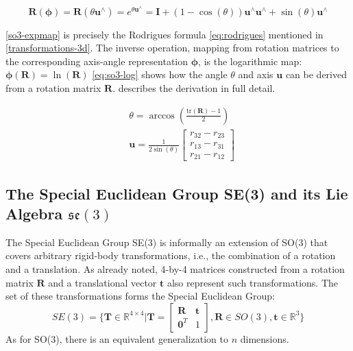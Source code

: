 \documentclass[headsepline, hidelinks, footsepline, footinclude=false, oneside, fontsize=11pt, paper=a4, listof=totoc, bibliography=totoc]{scrbook}
\begin{document}
\begin{equation}
\label{so3-expmap}
\mathbf{R}(\boldsymbol{\phi}) = \mathbf{R}(\theta \mathbf{u}^\wedge) = e^{\theta \mathbf{u}^\wedge} = \mathbf{I} + (1-\cos(\theta))\mathbf{u}^\wedge\mathbf{u}^\wedge + \sin(\theta)\mathbf{u}^\wedge
\end{equation}

\cref{so3-expmap} is precisely the Rodrigues formula \ref{eq:rodrigues} mentioned in \cref{transformations-3d}.
The inverse operation, mapping from rotation matrices to the corresponding axis-angle representation \(\boldsymbol{\phi}\), is the logarithmic map:
\(\boldsymbol{\phi}(\mathbf{R}) = \ln(\mathbf{R})\)
\cref{eq:so3-log} shows how the angle \(\theta\) and axis \(\mathbf{u}\) can be derived from a rotation matrix \(\mathbf{R}\). \cite{murrayMathematicalIntroductionRobotic1994} describes the derivation in full detail.

\begin{equation}
\label{eq:so3-log}
\begin{split}
& \theta = \arccos(\frac{\text{tr}(\mathbf{R})-1}{2}) \\
& \mathbf{u} = \frac{1}{2\sin(\theta)} \begin{bmatrix}r_{32} - r_{23} \\ r_{13} - r_{31} \\ r_{21} - r_{12}\end{bmatrix}
\end{split}
\end{equation}

\subsection{The Special Euclidean Group SE(3) and its Lie Algebra \(\mathfrak{se}(3)\) \label{se3}}
\label{sec:org0584930}
    The Special Euclidean Group SE(3) is informally an extension of SO(3) that covers arbitrary rigid-body transformations, i.e., the combination of a rotation and a translation.
As already noted, 4-by-4 matrices constructed from a rotation matrix \(\mathbf{R}\) and a translational vector \(\mathbf{t}\) also represent such transformations.
The set of these transformations forms the Special Euclidean Group:
\begin{equation}
SE(3) = \{\mathbf{T} \in \mathbb{R}^{4 \times 4} | \mathbf{T}=\begin{bmatrix} \mathbf{R}  & \mathbf{t} \\ \mathbf{0}^T & 1 \end{bmatrix}, \mathbf{R} \in SO(3), \mathbf{t} \in \mathbb{R}^3\}
\end{equation}
As for SO(3), there is an equivalent generalization to \(n\) dimensions.
\end{document}
